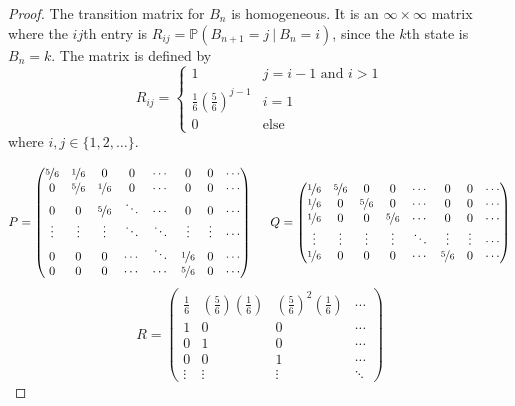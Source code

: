 \documentclass[12pt]{article}
\newcommand{\p}{\mathbb{P}}
\theoremstyle{definition}
\begin{document}
\begin{proof}
The transition matrix for $B_n$ is homogeneous.  It is an $\infty \times \infty$ matrix where the $ij$th entry is $R_{ij} = \p\left(B_{n+1} = j \ | \ B_n = i\right)$, since the $k$th state is $B_n = k$.  The matrix is defined by
\[ R_{ij} = \begin{cases}
      1 & j = i-1 \text{ and } i > 1 \\
      \frac16 (\frac56)^{j-1} & i = 1 \\
      0 & \text{else}
   \end{cases}
\]
where $i,j \in \{1,2, \dots \}$.

$$
P = \left(
\begin{matrix}
\nicefrac56 & \nicefrac16 & 0 & 0 & \cdots & 0 & 0 & \cdots \\ 
0 & \nicefrac56 & \nicefrac16 & 0 & \cdots & 0 & 0 & \cdots\\ 
0 & 0 & \nicefrac56 & \ddots & \cdots & 0 & 0 & \cdots \\ 
\vdots & \vdots & \vdots & \ddots & \ddots & \vdots & \vdots & \cdots \\
0 & 0 & 0 & \cdots & \ddots & \nicefrac16 & 0 & \cdots \\
0 & 0 & 0 & \cdots & \cdots & \nicefrac56 & 0 & \cdots \\ 
\end{matrix}
\right)
\hspace{.5cm}
%
%
%
Q = \left(
\begin{matrix}
\nicefrac16 & \nicefrac56 & 0 & 0 & \cdots & 0 & 0 & \cdots \\ 
\nicefrac16 & 0 & \nicefrac56 & 0 & \cdots & 0 & 0 & \cdots\\ 
\nicefrac16 & 0 & 0 & \nicefrac56 & \cdots & 0 & 0 & \cdots \\ 
\vdots & \vdots & \vdots & \vdots & \ddots & \vdots & \vdots & \cdots \\
\nicefrac16 & 0 & 0 & 0 & \cdots & \nicefrac56 & 0 & \cdots \\
\end{matrix}
\right)
$$
$$ R = \left(
\begin{matrix}
\frac16 & (\frac56)(\frac16) & (\frac56)^2(\frac16) & \cdots \\
1 & 0 & 0 & \cdots \\
0 & 1 & 0 & \cdots \\
0 & 0 & 1 & \cdots \\
\vdots & \vdots & \vdots & \ddots
\end{matrix} \right)
$$

\end{proof}
\end{document}
